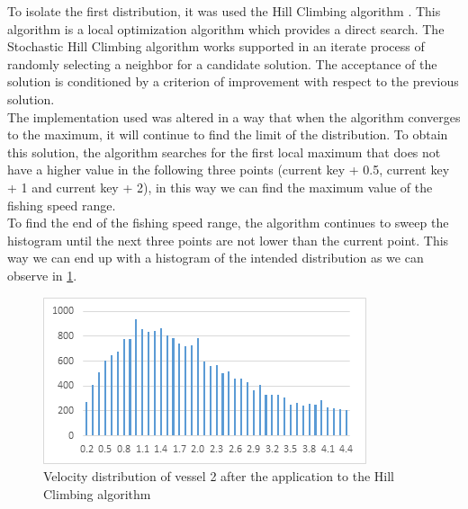To isolate the first distribution, it was used the Hill Climbing algorithm \cite{Kvasnicka1995HillCW}.  This algorithm is a local optimization algorithm which provides a direct search. The Stochastic Hill Climbing algorithm works supported in an iterate process of randomly selecting a neighbor for a candidate solution. The acceptance of the solution is conditioned by a criterion of improvement with respect to the previous solution.\\
The implementation used was altered in a way that when the algorithm converges to the maximum, it will continue to find the limit of the distribution.
To obtain this solution, the algorithm searches for the first local maximum that does not have a higher value in the following three points (current key + 0.5, current key + 1 and current key + 2), in this way we can find the maximum value of the fishing speed range. \\
To find the end of the fishing speed range, the algorithm continues to sweep the histogram until the next three points are not lower than the current point.
This way we can end up with a histogram of the intended distribution as we can observe in  \ref{fig:sog_hill_climbing}.

\begin{figure}[H]
    \centering
    \includegraphics[width=0.8\linewidth]{Chapters/img/sog_hill_climbing.png}
    \caption{Velocity distribution of vessel 2 after the application to the Hill Climbing algorithm}
    \label{fig:sog_hill_climbing}
\end{figure}

